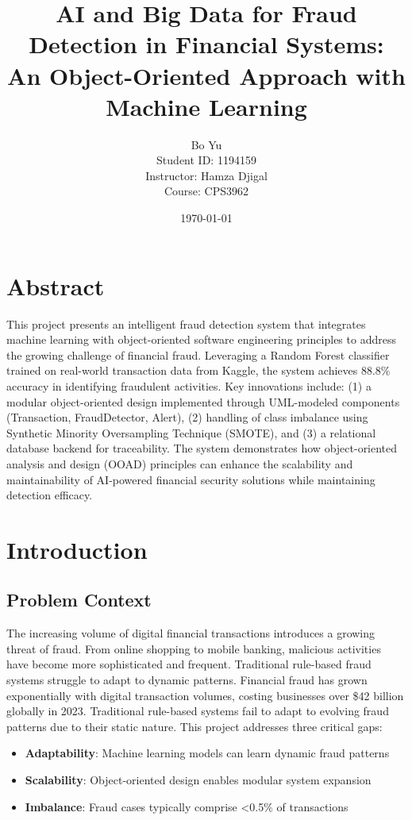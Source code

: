 \documentclass[12pt]{article}
\title{\textbf{AI and Big Data for Fraud Detection in Financial Systems: \\ An Object-Oriented Approach with Machine Learning}}
\author{Bo Yu \\
Student ID: 1194159 \\
Instructor: Hamza Djigal \\
Course: CPS3962}
\date{\today}
\begin{document}
\maketitle

\section*{Abstract}
This project presents an intelligent fraud detection system that integrates machine learning with object-oriented software engineering principles to address the growing challenge of financial fraud. Leveraging a Random Forest classifier trained on real-world transaction data from Kaggle, the system achieves 88.8\% accuracy in identifying fraudulent activities. Key innovations include: (1) a modular object-oriented design implemented through UML-modeled components (Transaction, FraudDetector, Alert), (2) handling of class imbalance using Synthetic Minority Oversampling Technique (SMOTE), and (3) a relational database backend for traceability. The system demonstrates how object-oriented analysis and design (OOAD) principles can enhance the scalability and maintainability of AI-powered financial security solutions while maintaining detection efficacy.

\section{Introduction}
\subsection{Problem Context}
The increasing volume of digital financial transactions introduces a growing threat of fraud. From online shopping to mobile banking, malicious activities have become more sophisticated and frequent. Traditional rule-based fraud systems struggle to adapt to dynamic patterns. Financial fraud has grown exponentially with digital transaction volumes, costing businesses over \$42 billion globally in 2023. Traditional rule-based systems fail to adapt to evolving fraud patterns due to their static nature. This project addresses three critical gaps:
\begin{itemize}[leftmargin=*]
    \item \textbf{Adaptability}: Machine learning models can learn dynamic fraud patterns
    \item \textbf{Scalability}: Object-oriented design enables modular system expansion
    \item \textbf{Imbalance}: Fraud cases typically comprise <0.5\% of transactions
\end{itemize}
\end{document}

